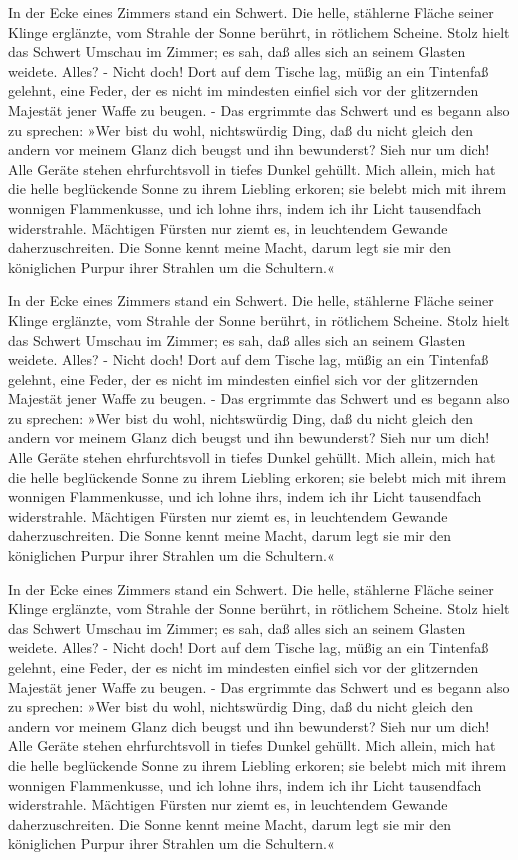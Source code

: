 In der Ecke eines Zimmers stand ein Schwert. Die helle, stählerne Fläche seiner
Klinge erglänzte, vom Strahle der Sonne berührt, in rötlichem Scheine. Stolz
hielt das Schwert Umschau im Zimmer; es sah, daß alles sich an seinem Glasten
weidete. Alles? - Nicht doch! Dort auf dem Tische lag, müßig an ein Tintenfaß
gelehnt, eine Feder, der es nicht im mindesten einfiel sich vor der
glitzernden Majestät jener Waffe zu beugen. - Das ergrimmte das Schwert und es
begann also zu sprechen: »Wer bist du wohl, nichtswürdig Ding, daß du nicht
gleich den andern vor meinem Glanz dich beugst und ihn bewunderst? Sieh nur
um dich! Alle Geräte stehen ehrfurchtsvoll in tiefes Dunkel gehüllt. Mich
allein, mich hat die helle beglückende Sonne zu ihrem Liebling erkoren; sie
belebt mich mit ihrem wonnigen Flammenkusse, und ich lohne ihrs, indem ich ihr
Licht tausendfach widerstrahle. Mächtigen Fürsten nur ziemt es, in leuchtendem
Gewande daherzuschreiten. Die Sonne kennt meine Macht, darum legt sie mir den
königlichen Purpur ihrer Strahlen um die Schultern.«

In der Ecke eines Zimmers stand ein Schwert. Die helle, stählerne Fläche seiner
Klinge erglänzte, vom Strahle der Sonne berührt, in rötlichem Scheine. Stolz
hielt das Schwert Umschau im Zimmer; es sah, daß alles sich an seinem Glasten
weidete. Alles? - Nicht doch! Dort auf dem Tische lag, müßig an ein Tintenfaß
gelehnt, eine Feder, der es nicht im mindesten einfiel sich vor der
glitzernden Majestät jener Waffe zu beugen. - Das ergrimmte das Schwert und es
begann also zu sprechen: »Wer bist du wohl, nichtswürdig Ding, daß du nicht
gleich den andern vor meinem Glanz dich beugst und ihn bewunderst? Sieh nur
um dich! Alle Geräte stehen ehrfurchtsvoll in tiefes Dunkel gehüllt. Mich
allein, mich hat die helle beglückende Sonne zu ihrem Liebling erkoren; sie
belebt mich mit ihrem wonnigen Flammenkusse, und ich lohne ihrs, indem ich ihr
Licht tausendfach widerstrahle. Mächtigen Fürsten nur ziemt es, in leuchtendem
Gewande daherzuschreiten. Die Sonne kennt meine Macht, darum legt sie mir den
königlichen Purpur ihrer Strahlen um die Schultern.«

In der Ecke eines Zimmers stand ein Schwert. Die helle, stählerne Fläche seiner
Klinge erglänzte, vom Strahle der Sonne berührt, in rötlichem Scheine. Stolz
hielt das Schwert Umschau im Zimmer; es sah, daß alles sich an seinem Glasten
weidete. Alles? - Nicht doch! Dort auf dem Tische lag, müßig an ein Tintenfaß
gelehnt, eine Feder, der es nicht im mindesten einfiel sich vor der
glitzernden Majestät jener Waffe zu beugen. - Das ergrimmte das Schwert und es
begann also zu sprechen: »Wer bist du wohl, nichtswürdig Ding, daß du nicht
gleich den andern vor meinem Glanz dich beugst und ihn bewunderst? Sieh nur
um dich! Alle Geräte stehen ehrfurchtsvoll in tiefes Dunkel gehüllt. Mich
allein, mich hat die helle beglückende Sonne zu ihrem Liebling erkoren; sie
belebt mich mit ihrem wonnigen Flammenkusse, und ich lohne ihrs, indem ich ihr
Licht tausendfach widerstrahle. Mächtigen Fürsten nur ziemt es, in leuchtendem
Gewande daherzuschreiten. Die Sonne kennt meine Macht, darum legt sie mir den
königlichen Purpur ihrer Strahlen um die Schultern.«

